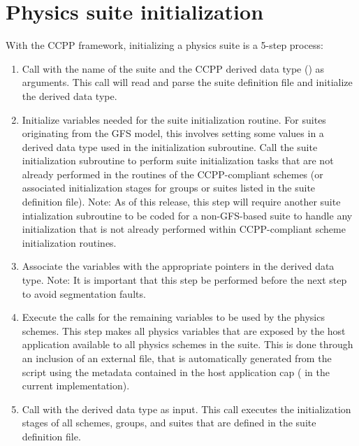 \section{Physics suite initialization}
\label{section: physics init}
With the CCPP framework, initializing a physics suite is a 5-step process:
\begin{enumerate}
\item Call  with the name of the suite and the CCPP derived data type () as arguments. This call will read and parse the suite definition file and initialize the  derived data type.
\item Initialize variables needed for the suite initialization routine. For suites originating from the GFS model, this involves setting some values in a derived data type used in the initialization subroutine. Call the suite initialization subroutine to perform suite initialization tasks that are not already performed in the  routines of the CCPP-compliant schemes (or associated initialization stages for groups or suites listed in the suite definition file). Note: As of this release, this step will require another suite intialization subroutine to be coded for a non-GFS-based suite to handle any initialization that is not already performed within CCPP-compliant scheme initialization routines.
\item Associate the  variables with the appropriate pointers in the  derived data type. Note: It is important that this step be performed before the next step to avoid segmentation faults.
\item Execute the  calls for the remaining variables to be used by the physics schemes. This step makes all physics variables that are exposed by the host application available to all physics schemes in the suite. This is done through an inclusion of an external file,  that is automatically generated from the  script using the metadata contained in the host application cap ( in the current implementation).
\item Call  with the  derived data type as input. This call executes the initialization stages of all schemes, groups, and suites that are defined in the suite definition file.
\end{enumerate}

